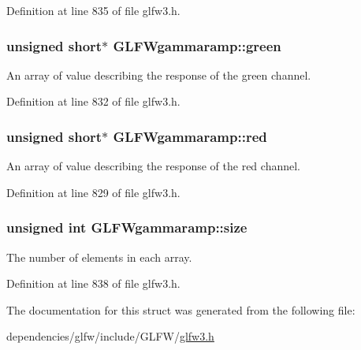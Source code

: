 Definition at line 835 of file glfw3.\-h.

\hypertarget{struct_g_l_f_wgammaramp_affccc6f5df47820b6562d709da3a5a3a}{
\subsubsection[{green}]{\setlength{\rightskip}{0pt plus 5cm}unsigned short$\ast$ G\-L\-F\-Wgammaramp\-::green}}\label{struct_g_l_f_wgammaramp_affccc6f5df47820b6562d709da3a5a3a}
An array of value describing the response of the green channel. 

Definition at line 832 of file glfw3.\-h.

\hypertarget{struct_g_l_f_wgammaramp_a2cce5d968734b685623eef913e635138}{
\subsubsection[{red}]{\setlength{\rightskip}{0pt plus 5cm}unsigned short$\ast$ G\-L\-F\-Wgammaramp\-::red}}\label{struct_g_l_f_wgammaramp_a2cce5d968734b685623eef913e635138}
An array of value describing the response of the red channel. 

Definition at line 829 of file glfw3.\-h.

\hypertarget{struct_g_l_f_wgammaramp_ad620e1cffbff9a32c51bca46301b59a5}{
\subsubsection[{size}]{\setlength{\rightskip}{0pt plus 5cm}unsigned {\bf int} G\-L\-F\-Wgammaramp\-::size}}\label{struct_g_l_f_wgammaramp_ad620e1cffbff9a32c51bca46301b59a5}
The number of elements in each array. 

Definition at line 838 of file glfw3.\-h.



The documentation for this struct was generated from the following file\-:\begin{DoxyCompactItemize}
\item 
dependencies/glfw/include/\-G\-L\-F\-W/\hyperlink{glfw3_8h}{glfw3.\-h}\end{DoxyCompactItemize}
